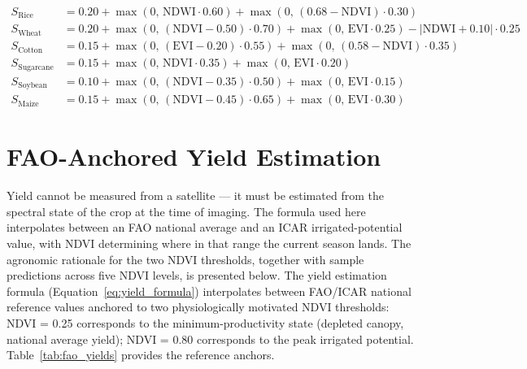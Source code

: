 \documentclass[12pt,a4paper,oneside]{report}
\begin{document}
\begin{align}
S_\mathrm{Rice}      &= 0.20 + \max(0,\, \mathrm{NDWI} \cdot 0.60)
                        + \max(0,\, (0.68 - \mathrm{NDVI}) \cdot 0.30) \\
S_\mathrm{Wheat}     &= 0.20 + \max(0,\, (\mathrm{NDVI} - 0.50) \cdot 0.70)
                        + \max(0,\, \mathrm{EVI} \cdot 0.25)
                        - |\mathrm{NDWI} + 0.10| \cdot 0.25 \\
S_\mathrm{Cotton}    &= 0.15 + \max(0,\, (\mathrm{EVI} - 0.20) \cdot 0.55)
                        + \max(0,\, (0.58 - \mathrm{NDVI}) \cdot 0.35) \\
S_\mathrm{Sugarcane} &= 0.15 + \max(0,\, \mathrm{NDVI} \cdot 0.35)
                        + \max(0,\, \mathrm{EVI} \cdot 0.20) \\
S_\mathrm{Soybean}   &= 0.10 + \max(0,\, (\mathrm{NDVI} - 0.35) \cdot 0.50)
                        + \max(0,\, \mathrm{EVI} \cdot 0.15) \\
S_\mathrm{Maize}     &= 0.15 + \max(0,\, (\mathrm{NDVI} - 0.45) \cdot 0.65)
                        + \max(0,\, \mathrm{EVI} \cdot 0.30)
\end{align}

\section{FAO-Anchored Yield Estimation}
\label{sec:fao_yield}

Yield cannot be measured from a satellite — it must be estimated from the spectral state of the crop at the time of imaging. The formula used here interpolates between an FAO national average and an ICAR irrigated-potential value, with NDVI determining where in that range the current season lands. The agronomic rationale for the two NDVI thresholds, together with sample predictions across five NDVI levels, is presented below.
The yield estimation formula (Equation~\ref{eq:yield_formula}) interpolates between
FAO/ICAR national reference values anchored to two physiologically motivated NDVI
thresholds: NDVI = 0.25 corresponds to the minimum-productivity state (depleted
canopy, national average yield); NDVI = 0.80 corresponds to the peak irrigated
potential. Table~\ref{tab:fao_yields} provides the reference anchors.
\end{document}
